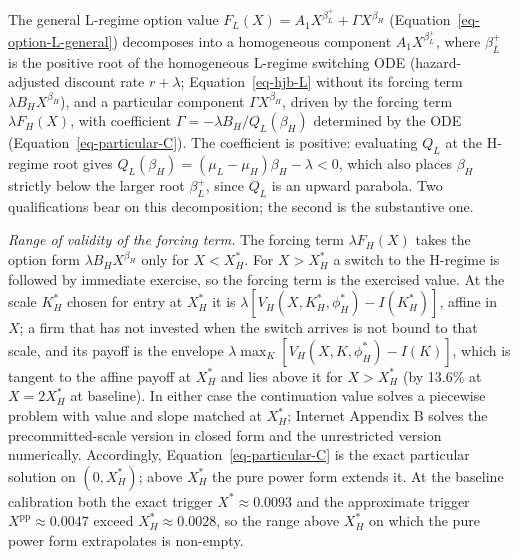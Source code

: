 \documentclass[
  11pt,
  letterpaper,
]{scrartcl}
\begin{document}
The general L-regime option value
\(F_L(X) = A_1 X^{\beta_L^+} + \Gamma X^{\beta_H}\)
(Equation~\ref{eq-option-L-general}) decomposes into a homogeneous
component \(A_1 X^{\beta_L^+}\), where \(\beta_L^+\) is the positive
root of the homogeneous L-regime switching ODE (hazard-adjusted discount
rate \(r + \lambda\); Equation~\ref{eq-hjb-L} without its forcing term
\(\lambda B_H X^{\beta_H}\)), and a particular component
\(\Gamma X^{\beta_H}\), driven by the forcing term \(\lambda F_H(X)\),
with coefficient \(\Gamma = -\lambda B_H / Q_L(\beta_H)\) determined by
the ODE (Equation~\ref{eq-particular-C}). The coefficient is positive:
evaluating \(Q_L\) at the H-regime root gives
\(Q_L(\beta_H) = (\mu_L - \mu_H)\beta_H - \lambda < 0\), which also
places \(\beta_H\) strictly below the larger root \(\beta_L^+\), since
\(Q_L\) is an upward parabola. Two qualifications bear on this
decomposition; the second is the substantive one.

\emph{Range of validity of the forcing term.} The forcing term
\(\lambda F_H(X)\) takes the option form \(\lambda B_H X^{\beta_H}\)
only for \(X < X_H^*\). For \(X > X_H^*\) a switch to the H-regime is
followed by immediate exercise, so the forcing term is the exercised
value. At the scale \(K_H^*\) chosen for entry at \(X_H^*\) it is
\(\lambda [V_H(X, K_H^*, \phi_H^*) - I(K_H^*)]\), affine in \(X\); a
firm that has not invested when the switch arrives is not bound to that
scale, and its payoff is the envelope
\(\lambda \max_K [V_H(X, K, \phi_H^*) - I(K)]\), which is tangent to the
affine payoff at \(X_H^*\) and lies above it for \(X > X_H^*\) (by
13.6\% at \(X = 2X_H^*\) at baseline). In either case the continuation
value solves a piecewise problem with value and slope matched at
\(X_H^*\); Internet Appendix B solves the precommitted-scale version in
closed form and the unrestricted version numerically. Accordingly,
Equation~\ref{eq-particular-C} is the exact particular solution on
\((0, X_H^*)\); above \(X_H^*\) the pure power form extends it. At the
baseline calibration both the exact trigger \(X^* \approx 0.0093\) and
the approximate trigger \(X^{\text{pp}} \approx 0.0047\) exceed
\(X_H^* \approx 0.0028\), so the range above \(X_H^*\) on which the pure
power form extrapolates is non-empty.
\end{document}
